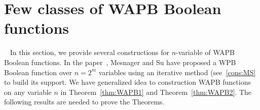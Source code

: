 \documentclass{article}[12pt]
\newtheorem{lemma}[theorem]{Lemma}
\begin{document}

\section{Few classes of WAPB Boolean functions}~\label{sec:WABP}
In this section, we provide several constructions for $n$-variable of WAPB Boolean functions. In the paper~\cite{MS21}, Mesnager and Su have proposed a WPB Boolean function over $n = 2^m$ variables using an iterative method (see~\ref{cons:MS} to build its support. We have generalized idea to construction WAPB functions on any variable $n$ in Theorem~\ref{thm:WAPB1} and Theorem~\ref{thm:WAPB2}. The following results are needed to prove the Theorems.
\end{document}
